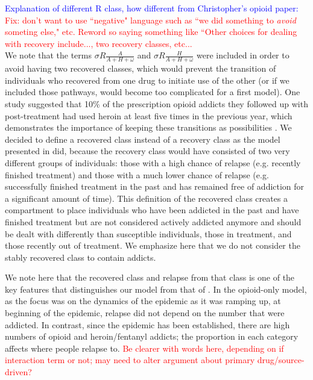 \documentclass[12pt]{article}
\begin{document}
\textcolor{blue}{Explanation of different R class, how different from Christopher's opioid paper:} \\
\textcolor{red}{Fix: don't want to use ``negative" language such as ``we did something to \textit{avoid} someting else," etc. Reword so saying something like ``Other choices for dealing with recovery include..., two recovery classes, etc...} \\
We note that the terms $\sigma R \frac{A}{A+H+\omega}$ and $\sigma R \frac{H}{A+H+\omega}$ were included in order to avoid having two recovered classes, which would prevent the transition of individuals who recovered from one drug to initiate use of the other (or if we included those pathways, would become too complicated for a first model). One study suggested that 10\% of the prescription opioid addicts they followed up with post-treatment had used heroin at least five times in the previous year, which demonstrates the importance of keeping these transitions as possibilities \cite{Weiss}. We decided to define a recovered class instead of a recovery class as the model presented in \cite{Battista} did, because the recovery class would have consisted of two very different groups of individuals: those with a high chance of relapse (e.g. recently finished treatment) and those with a much lower chance of relapse (e.g. successfully finished treatment in the past and has remained free of addiction for a significant amount of time). This definition of the recovered class creates a compartment to place individuals who have been addicted in the past and have finished treatment but are not considered actively addicted anymore and should be dealt with differently than susceptible individuals, those in treatment, and those recently out of treatment. We emphasize here that we do not consider the stably recovered class to contain addicts. %

We note here that the recovered class and relapse from that class is one of the key features that distinguishes our model from that of \cite{Battista}. In the opioid-only model, as the focus was on the dynamics of the epidemic as it was ramping up, at beginning of the epidemic, relapse did not depend on the number that were addicted. In contrast, since the epidemic has been established, there are high numbers of opioid and heroin/fentanyl addicts; the proportion in each category affects where people relapse to. \textcolor{red}{Be clearer with words here, depending on if interaction term or not; may need to alter argument about primary drug/source-driven?} 
\end{document}
